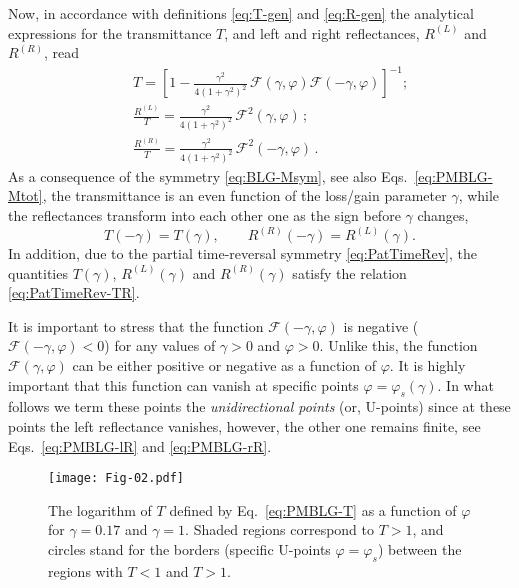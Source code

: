 \documentclass[aps,pra,reprint,showpacs,bibnotes,preprintnumbers,twoside,eqsecnum]{revtex4-1}
\begin{document}
Now, in accordance with definitions \eqref{eq:T-gen} and \eqref{eq:R-gen} the analytical expressions for the transmittance $T$, and left and right reflectances, $R^{(L)}$ and $R^{(R)}$, read
%
\begin{eqnarray}
&&T=\left[1-\frac{\gamma^2}{4(1+\gamma^2)^{2}}\,\mathcal{F}(\gamma,\varphi)\mathcal{F}(-\gamma,\varphi)\right]^{-1};\label{eq:PMBLG-T}\\
&&\frac{R^{(L)}}{T}=\frac{\gamma^2}{4(1+\gamma^2)^{2}}\,\mathcal{F}^2(\gamma,\varphi)\,;\label{eq:PMBLG-lR}\\
&&\frac{R^{(R)}}{T}=\frac{\gamma^2}{4(1+\gamma^2)^{2}}\,\mathcal{F}^2(-\gamma,\varphi)\,.\label{eq:PMBLG-rR}
\end{eqnarray}
As a consequence of the symmetry \eqref{eq:BLG-Msym}, see also Eqs.~\eqref{eq:PMBLG-Mtot}, the transmittance is an even function of the loss/gain parameter $\gamma$, while the reflectances transform into each other one as the sign before $\gamma$ changes,
%
\begin{equation}\label{eq:PMBLG-Teven-Rodd}
T(-\gamma)=T(\gamma),\qquad R^{(R)}(-\gamma)=R^{(L)}(\gamma).
\end{equation}
In addition, due to the partial time-reversal symmetry \eqref{eq:PatTimeRev}, the quantities $T(\gamma)$, $R^{(L)}(\gamma)$ and $R^{(R)}(\gamma)$ satisfy the relation \eqref{eq:PatTimeRev-TR}.

It is important to stress that the function $\mathcal{F}(-\gamma,\varphi)$ is negative ($\mathcal{F}(-\gamma,\varphi)<0$) for any values of $\gamma > 0$ and $\varphi>0$. Unlike this, the function $\mathcal{F}(\gamma,\varphi)$ can be either positive or negative as a function of $\varphi$. It is highly important that this function can vanish at specific points $\varphi=\varphi_s(\gamma)$. In what follows we term these points the {\it unidirectional points} (or, U-points) since at these points the left reflectance vanishes, however, the other one remains finite, see Eqs.~\eqref{eq:PMBLG-lR} and \eqref{eq:PMBLG-rR}.

\begin{figure}[!t]
\texttt{[image: Fig-02.pdf]}
\caption{The logarithm of $T$ defined by Eq.~\eqref{eq:PMBLG-T} as a function of $\varphi$ for $\gamma=0.17$ and $\gamma=1$. Shaded regions correspond to $T>1$, and circles stand for the borders (specific U-points $\varphi=\varphi_s$) between the regions with $T<1$ and $T>1$.}\label{fig:Fig-02}
\end{figure}
\end{document}
